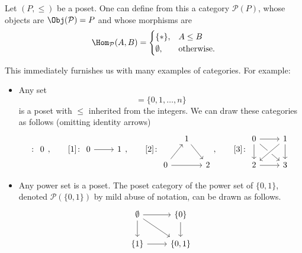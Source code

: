 \documentclass[main.tex]{subfiles}
\begin{document}
\begin{example}
  \label{eg:poset_category}
  Let $(P, \leq)$ be a poset. One can define from this a category $\mathcal{P}(P)$, whose objects are $\Obj(\mathcal{P}) = P$ and whose morphisms are
  \begin{equation*}
    \Hom_{\mathcal{P}}(A, B) =
    \begin{cases}
      \{*\}, & A \leq B \\
      \emptyset, & \text{otherwise}.
    \end{cases}
  \end{equation*}

  This immediately furnishes us with many examples of categories. For example:
  \begin{itemize}
    \item Any set
      \begin{equation*}
        [n] = \{0, 1, \ldots, n\}
      \end{equation*}
      is a poset with $\leq$ inherited from the integers. We can draw these categories as follows (omitting identity arrows)
      \begin{equation*}
        [0]\colon
        \begin{tikzcd}
          0
        \end{tikzcd}
        ,\qquad
        [1]\colon
        \begin{tikzcd}
          0
          \arrow[r]
          & 1
        \end{tikzcd}
        ,\qquad[2]\colon
        \begin{tikzcd}[column sep=small]
          & 1
          \arrow[dr]
          \\
          0
          \arrow[ur]
          \arrow[rr]
          & & 2
        \end{tikzcd}
        ,\qquad[3]\colon
        \begin{tikzcd}
          0
          \arrow[r]
          \arrow[d]
          \arrow[rd]
          & 1
          \arrow[d]
          \arrow[dl, crossing over]
          \\
          2
          \arrow[r]
          & 3
        \end{tikzcd}
      \end{equation*}

    \item Any power set is a poset. The poset category of the power set of $\{0, 1\}$, denoted $\mathcal{P}(\{0, 1\})$ by mild abuse of notation, can be drawn as follows.
      \begin{equation*}
        \begin{tikzcd}
          \emptyset
          \arrow[dr]
          \arrow[r]
          \arrow[d]
          & \{0\}
          \arrow[d]
          \\
          \{1\}
          \arrow[r]
          & \{0, 1\}
        \end{tikzcd}
      \end{equation*}


\end{itemize}
\end{example}
\end{document}
